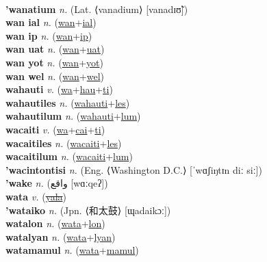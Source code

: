  \label{wan ayf} \\
\textbf{'wanatium} \textit{n.} (Lat. ⟨vanadium⟩ [vanadɪʊ̃])
 \label{'wanatium} \\
\textbf{wan ial} \textit{n.} (\hyperref[wan]{wan}+\hyperref[ial]{ial})
 \label{wan ial} \\
\textbf{wan ip} \textit{n.} (\hyperref[wan]{wan}+\hyperref[ip]{ip})
 \label{wan ip} \\
\textbf{wan uat} \textit{n.} (\hyperref[wan]{wan}+\hyperref[uat]{uat})
 \label{wan uat} \\
\textbf{wan yot} \textit{n.} (\hyperref[wan]{wan}+\hyperref[yot]{yot})
 \label{wan yot} \\
\textbf{wan wel} \textit{n.} (\hyperref[wan]{wan}+\hyperref[wel]{wel})
 \label{wan wel} \\
\textbf{wahauti} \textit{v.} (\hyperref[wa]{wa}+\hyperref[hau]{hau}+\hyperref[ti]{ti})
 \label{wahauti} \\
\textbf{wahautiles} \textit{n.} (\hyperref[wahauti]{wahauti}+\hyperref[les]{les})
 \label{wahautiles} \\
\textbf{wahautilum} \textit{n.} (\hyperref[wahauti]{wahauti}+\hyperref[lum]{lum})
 \label{wahautilum} \\
\textbf{wacaiti} \textit{v.} (\hyperref[wa]{wa}+\hyperref[cai]{cai}+\hyperref[ti]{ti})
 \label{wacaiti} \\
\textbf{wacaitiles} \textit{n.} (\hyperref[wacaiti]{wacaiti}+\hyperref[les]{les})
 \label{wacaitiles} \\
\textbf{wacaitilum} \textit{n.} (\hyperref[wacaiti]{wacaiti}+\hyperref[lum]{lum})
 \label{wacaitilum} \\
\textbf{'wacintontisi} \textit{n.} (Eng. ⟨Washington D.C.⟩ [ˈwɑʃiŋtɪn diː siː])
 \label{'wacintontisi} \\
\textbf{'wake} \textit{n.} ({\arabics{}واقع‎} [wɑːqeʔ])
 \label{'wake} \\
\textbf{wata} \textit{v.} (\hyperref[yala]{\sout{yala}})
 \label{wata} \\
\textbf{'wataiko} \textit{n.} (Jpn. ⟨和太鼓⟩ [ɰadaikɔː])
 \label{'wataiko} \\
\textbf{watalon} \textit{n.} (\hyperref[wata]{wata}+\hyperref[lon]{lon})
 \label{watalon} \\
\textbf{watalyan} \textit{n.} (\hyperref[wata]{wata}+\hyperref[lyan]{lyan})
 \label{watalyan} \\
\textbf{watamamul} \textit{n.} (\hyperref[wata]{wata}+\hyperref[mamul]{mamul})
 \label{watamamul} \\

